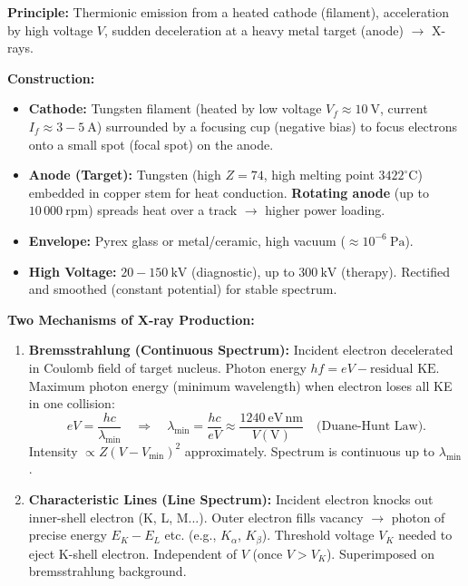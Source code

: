 \documentclass[11pt]{article}
\begin{document}
\begin{experience}
\textbf{Principle:} Thermionic emission from a heated cathode (filament), acceleration by high voltage $V$, sudden deceleration at a heavy metal target (anode) $\rightarrow$ X-rays.

\textbf{Construction:}
\begin{itemize}
\item \textbf{Cathode:} Tungsten filament (heated by low voltage $V_f \approx 10\ \mathrm{V}$, current $I_f \approx 3-5\ \mathrm{A}$) surrounded by a focusing cup (negative bias) to focus electrons onto a small spot (focal spot) on the anode.
\item \textbf{Anode (Target):} Tungsten (high $Z=74$, high melting point $3422^\circ\mathrm{C}$) embedded in copper stem for heat conduction. \textbf{Rotating anode} (up to $10\,000\ \mathrm{rpm}$) spreads heat over a track $\rightarrow$ higher power loading.
\item \textbf{Envelope:} Pyrex glass or metal/ceramic, high vacuum ($\approx 10^{-6}\ \mathrm{Pa}$).
\item \textbf{High Voltage:} $20-150\ \mathrm{kV}$ (diagnostic), up to $300\ \mathrm{kV}$ (therapy). Rectified and smoothed (constant potential) for stable spectrum.
\end{itemize}

\textbf{Two Mechanisms of X-ray Production:}
\begin{enumerate}
\item \textbf{Bremsstrahlung (Continuous Spectrum):} Incident electron decelerated in Coulomb field of target nucleus. Photon energy $hf = eV - \text{residual KE}$. Maximum photon energy (minimum wavelength) when electron loses all KE in one collision:
\[
eV = \frac{hc}{\lambda_{\min}} \quad \Rightarrow \quad \lambda_{\min} = \frac{hc}{eV} \approx \frac{1240\ \mathrm{eV\,nm}}{V(\mathrm{V})} \quad \text{(Duane-Hunt Law)}.
\]
Intensity $\propto Z (V - V_{\min})^2$ approximately. Spectrum is continuous up to $\lambda_{\min}$.
\item \textbf{Characteristic Lines (Line Spectrum):} Incident electron knocks out inner-shell electron (K, L, M...). Outer electron fills vacancy $\rightarrow$ photon of precise energy $E_K - E_L$ etc. (e.g., $K_\alpha$, $K_\beta$). Threshold voltage $V_K$ needed to eject K-shell electron. Independent of $V$ (once $V > V_K$). Superimposed on bremsstrahlung background.
\end{enumerate}


\end{experience}
\end{document}
